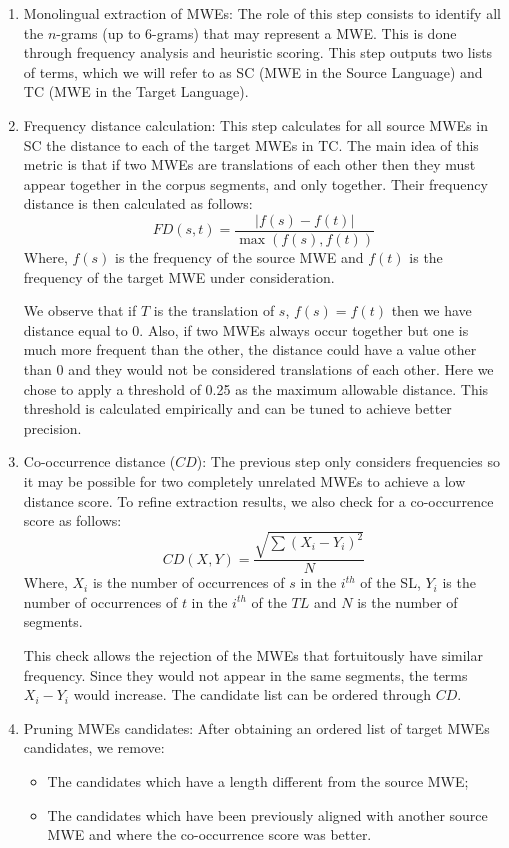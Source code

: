 \documentclass[output=paper,modfonts,nonflat]{langsci/langscibook}
\begin{document}
\begin{enumerate}
 \item Monolingual extraction of MWEs: The role of this step consists to identify all the $n$-grams (up to 6-grams) that may represent a MWE. This is done through frequency analysis and heuristic scoring. This step outputs two lists of terms, which we will refer to as SC (MWE in the Source Language) and TC (MWE in the Target Language).
 \item Frequency distance calculation: This step calculates for all source MWEs in SC the distance to each of the target MWEs in TC. The main idea of this metric is that if two MWEs are translations of each other then they must appear together in the corpus segments, and only together. Their frequency distance is then calculated as follows:
 \begin{equation}
  FD(s,t)=\frac{|f(s)-f(t)|}{\max(f(s),f(t))}
 \end{equation}
 Where, $f(s)$ is the frequency of the source MWE and $f(t)$ is the frequency of the target MWE under consideration.

We observe that if $T$ is the translation of $s$, $f(s) = f(t) $ then we have distance equal to 0. 
Also, if two MWEs always occur together but one is much more frequent than the other, the distance could have a value other than 0 and they would not be considered translations of each other. 
Here we chose to apply a threshold of 0.25 as the maximum allowable distance. This threshold is calculated empirically and can be tuned to achieve better precision.

\item Co-occurrence distance ($CD$): The previous step only considers frequencies so it may be possible for two completely unrelated MWEs to achieve a low distance score. To refine extraction results, we also check for a co-occurrence score as follows:
\begin{equation}
  CD(X,Y)=\frac{\sqrt{\sum(X_i-Y_i)^2}}{N}
\end{equation}
Where, $X_i$ is the number of occurrences of $s$ in the $i^{th}$  of the SL, $Y_i$ is the number of occurrences of $t$ in the $i^{th}$  of the $TL$ and $N$ is the number of segments.

This check allows the rejection of the MWEs that fortuitously have similar frequency. Since they would not appear in the same segments, the terms $X_i-Y_i$ would increase. The candidate list can be ordered through $CD$.

\item Pruning MWEs candidates: After obtaining an ordered list of target MWEs candidates, we remove:
\begin{itemize}
 \item The candidates which have a length different from the source MWE;
 \item The candidates which have been previously aligned with another source MWE and where the co-occurrence score was better.
\end{itemize}
\end{enumerate}
\end{document}

